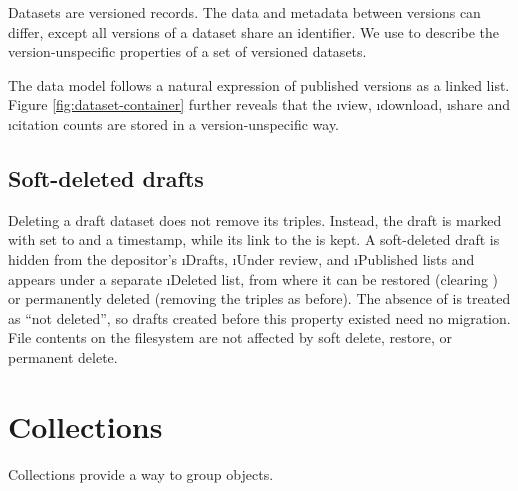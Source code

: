 
  Datasets are versioned records.  The data and metadata between versions
  can differ, except all versions of a dataset share an identifier.  We use
   to describe the version-unspecific properties
  of a set of versioned datasets.


  The data model follows a natural expression of published versions as a
  linked list.  Figure \ref{fig:dataset-container} further reveals that
  the \i{view}, \i{download}, \i{share} and \i{citation} counts are stored
  in a version-unspecific way.

\subsection{Soft-deleted drafts}

  Deleting a draft dataset does not remove its triples.  Instead, the draft
  is marked with  set to  and a
   timestamp, while its link to the
   is kept.  A soft-deleted draft is hidden from
  the depositor's \i{Drafts}, \i{Under review}, and \i{Published} lists and
  appears under a separate \i{Deleted} list, from where it can be restored
  (clearing ) or permanently deleted (removing the
  triples as before).  The absence of  is treated as
  ``not deleted'', so drafts created before this property existed need no
  migration.  File contents on the filesystem are not affected by soft
  delete, restore, or permanent delete.

\section{Collections}

  Collections provide a way to group  objects.


